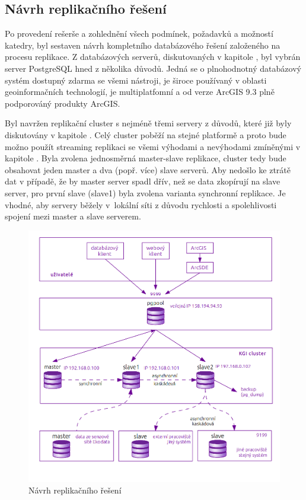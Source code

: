 \subsection[Návrh replikačního řešení]{Návrh replikačního řešení}
      \label{kNavrh}

Po provedení rešerše a zohlednění všech podmínek, požadavků a možností katedry, byl sestaven návrh kompletního databázového řešení založeného na procesu replikace. Z databázových serverů, diskutovaných v kapitole , byl vybrán server PostgreSQL hned z několika důvodů. Jedná se o plnohodnotný databázový systém dostupný zdarma se všemi nástroji, je široce používaný v oblasti geoinformačních technologií, je multiplatfomní a od verze ArcGIS 9.3 plně podporováný produkty ArcGIS. 

Byl navržen replikační cluster s nejméně třemi servery z důvodů, které již byly diskutovány v kapitole . Celý cluster poběží na stejné platformě a proto bude možno použít streaming replikaci se všemi výhodami a nevýhodami zmíněnými v kapitole . Byla zvolena jednosměrná master-slave replikace, cluster tedy bude obsahovat jeden master a dva (popř. více) slave serverů. Aby nedošlo ke ztrátě dat v případě, že by master server spadl dřív, než se data zkopírují na slave server, pro první slave (slave1) byla zvolena varianta synchronní replikace. Je vhodné, aby servery běžely v~lokální síti z důvodu rychlosti a spolehlivosti spojení mezi master a slave serverem. 

      \begin{figure}[H]
        \label{oNavrhKatedra}
        \centering
        \includegraphics[scale=1]{../../../grafy/obr/schema_navrhKatedra.png}
        \caption {Návrh replikačního řešení}
      \end{figure}

